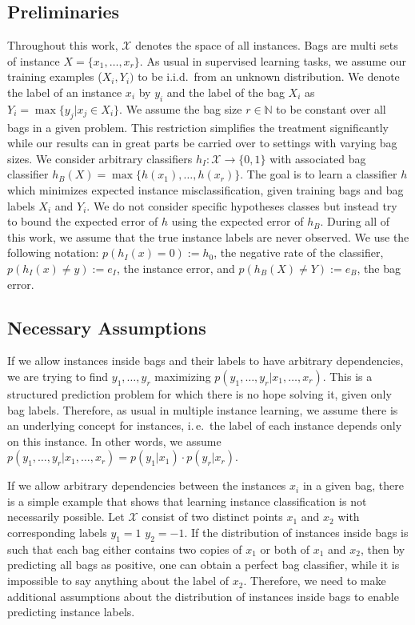 \subsection{Preliminaries}
Throughout this work, $\mathcal{X}$ denotes the space of all instances. Bags are multi sets of instance $X=\{x_1,\dotsc, x_r\}$.
As usual in supervised learning tasks, we assume our training examples ($X_i,Y_i)$ to be i.i.d.\ from an unknown distribution.
We denote the label of an instance $x_i$ by $y_i$ and the label of the bag $X_i$ as $Y_i = \max\{y_j | x_j \in  X_i\}$.
We assume the bag size $r\in \mathbb{N}$ to be constant over all bags in a given problem. This restriction simplifies the treatment
significantly while our results can in great parts be carried over to settings with varying bag sizes.
We consider arbitrary classifiers $h_I\colon \mathcal{X} \rightarrow \{0, 1\}$ with associated bag classifier
$h_B(X) = \max \{h(x_1),\dotsc,h(x_r)\}$.
The goal is to learn a classifier $h$ which minimizes expected instance misclassification, given training bags and bag labels
$X_i$ and $Y_i$.
We do not consider specific hypotheses classes but instead try to bound the expected error of $h$ using the expected error of $h_B$.
During all of this work, we assume that the true instance labels are never observed.
We use the following notation: $p(h_I(x)=0):= h_0$, the negative rate of the classifier,
$p(h_I(x) \neq y) := e_I$, the instance error, and $p(h_B(X) \neq Y) := e_B$, the bag error.

\subsection{Necessary Assumptions}
If we allow instances inside bags and their labels to have arbitrary dependencies, we are trying to find
$y_1,\dotsc,y_r$ maximizing $p(y_1,\dotsc, y_r | x_1, \dotsc, x_r)$. This is a structured 
prediction problem for which there is no hope solving it, given only bag labels.
Therefore, as usual in multiple instance learning, we assume there is an underlying concept for instances,
i.\,e.\ the label of each instance depends only on this instance.
In other words, we assume $p(y_1,\dotsc, y_r | x_1, \dotsc, x_r)=p(y_1|x_1) \cdot p(y_r|x_r)$.

If we allow arbitrary dependencies between the instances $x_i$ in a given bag, there is a simple example 
\citep{sabato2009homogeneous} that shows that learning instance classification is not necessarily possible.
Let $\mathcal{X}$ consist of two
distinct points $x_1$ and $x_2$ with corresponding labels $y_1 = 1$ $y_2 = -1$. If the distribution
of instances inside bags is such that each bag either contains two copies of $x_1$ or both of $x_1$ and $x_2$, then
by predicting all bags as positive, one can obtain a perfect bag classifier, while it is impossible to say anything
about the label of $x_2$.
Therefore, we need to make additional assumptions about the distribution of instances inside bags to enable
predicting instance labels.

